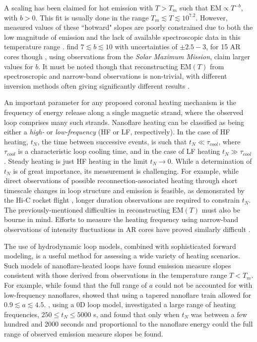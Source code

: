 \documentclass[preprint]{aastex}
\begin{document}
	\par A scaling has been claimed for hot emission with $T>T_m$ such that $\mathrm{EM}\propto T^{-b}$, with $b>0$. This fit is usually done in the range $T_m\lesssim T\lesssim10^{7.2}$. However, measured values of these ``hotward" slopes are poorly constrained due to both the low magnitude of emission and the lack of available spectroscopic data in this temperature range \citep{winebarger_defining_2012}. \citet{warren_systematic_2012} find $7\lesssim b\lesssim10$ with uncertainties of $\pm2.5-3$, for 15 AR cores though \citet{del_zanna_elemental_2014}, using observations from the \textit{Solar Maximum Mission}, claim larger values for $b$. It must be noted though that reconstructing $\mathrm{EM}(T)$ from spectroscropic and narrow-band observations is non-trivial, with different inversion methods often giving significantly different results \citep{landi_monte_2012,guennou_can_2013}.
	\par An important parameter for any proposed coronal heating mechanism is the frequency of energy release along a single magnetic strand, where the observed loop comprises many such strands. Nanoflare heating can be classified as being either a \textit{high-} or \textit{low-frequency} (HF or LF, respectively). In the case of HF heating, $t_N$, the time between successive events, is such that $t_N\ll\tau_{cool}$, where $\tau_{cool}$ is a characteristic loop cooling time, and in the case of LF heating $t_N\gg\tau_{cool}$ \citep{mulu-moore_can_2011,warren_constraints_2011,bradshaw_diagnosing_2012,reep_diagnosing_2013,cargill_modelling_2015}. Steady heating is just HF heating in the limit $t_N\to0$. While a determination of $t_N$ is of great importance, its measurement is challenging. For example, while direct observations of possible reconnection-associated heating through short timescale changes in loop structure and emission is feasible, as demonsrated by the Hi-C rocket flight \citep{cirtain_energy_2013,cargill_solar_2013}, longer duration observations are required to constrain $t_N$. The previously-mentioned difficulties in reconstructing $\mathrm{EM}(T)$ must also be bourne in mind. Efforts to measure the heating frequency using narrow-band observations of intensity fluctuations in AR cores  have proved similarly difficult \citep{ugarte-urra_determining_2014}.
	\par The use of hydrodynamic loop models, combined with sophisticated forward modeling, is a useful method for assessing a wide variety of heating scenarios. Such models of nanoflare-heated loops have found emission measure slopes consistent with those derived from observations in the temperature range $T<T_m$. For example, while \citet{bradshaw_diagnosing_2012} found that the full range of $a$ could not be accounted for with low-frequency nanoflares, \citet{reep_diagnosing_2013} showed that using a tapered nanoflare train allowed for $0.9\lesssim a\lesssim4.5$. \citet{cargill_active_2014}, using a 0D loop model, investigated a large range of heating frequencies, $250\le t_N\le5000$ s, and found that only when $t_N$ was between a few hundred and 2000 seconds and proportional to the nanoflare energy could the full range of observed emission measure slopes be found.
\end{document}

